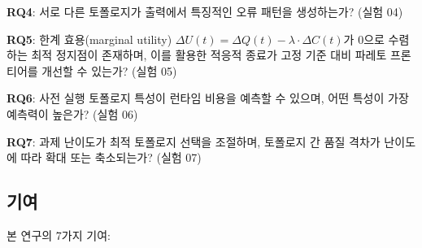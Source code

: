 \documentclass[a4paper,11pt]{article}
\begin{document}
\textbf{RQ4}: 서로 다른 토폴로지가 출력에서 특징적인 오류 패턴을 생성하는가? (실험 04)

\textbf{RQ5}: 한계 효용(marginal utility) $\Delta U(t) = \Delta Q(t) - \lambda \cdot \Delta C(t)$가 0으로 수렴하는 최적 정지점이 존재하며, 이를 활용한 적응적 종료가 고정 기준 대비 파레토 프론티어를 개선할 수 있는가? (실험 05)

\textbf{RQ6}: 사전 실행 토폴로지 특성이 런타임 비용을 예측할 수 있으며, 어떤 특성이 가장 예측력이 높은가? (실험 06)

\textbf{RQ7}: 과제 난이도가 최적 토폴로지 선택을 조절하며, 토폴로지 간 품질 격차가 난이도에 따라 확대 또는 축소되는가? (실험 07)

\subsection{기여}

본 연구의 7가지 기여:
\end{document}
